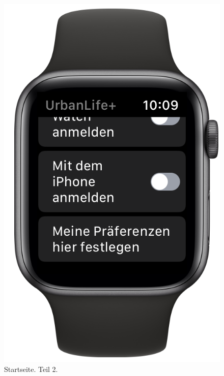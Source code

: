 \begin{minipage}{.45\textwidth}
	\begin{figure}[H]
		\centering
		\includegraphics[width=.68\textwidth]{./images/prototype/watchos/home2.png}
		\caption{\label{fig:app:watchos:home2}Startseite. Teil 2.}
	\end{figure}
\end{minipage}

